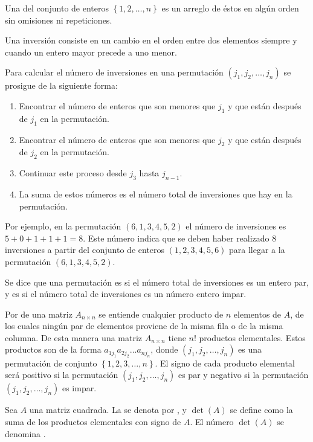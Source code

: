 \documentclass[a4paper,12pt]{article}
\begin{document}
\begin{concept}
  Una  del conjunto de enteros $\left\{ 1,2,\ldots,n \right\}$
  es un arreglo de éstos en algún orden sin omisiones ni repeticiones.
\end{concept}

Una inversión consiste en un cambio en el orden entre dos elementos siempre y
cuando un entero mayor precede a uno menor.

Para calcular el número de inversiones en una permutación
$(j_1,j_2,\ldots,j_n)$ se prosigue de la siguiente forma:
\begin{enumerate}
  \item Encontrar el número de enteros que son menores que $j_1$ y que están
    después de $j_1$ en la permutación.
  \item Encontrar el número de enteros que son menores que $j_2$ y que están
    después de $j_2$ en la permutación.
  \item Continuar este proceso desde $j_3$ hasta $j_{n-1}$.
  \item La suma de estos números es el número total de inversiones que hay en
    la permutación.
\end{enumerate}
Por ejemplo, en la permutación $(6,1,3,4,5,2)$ el número de inversiones es
$5+0+1+1+1=8$. Este número indica que se deben haber realizado 8 inversiones a
partir del conjunto de enteros $(1,2,3,4,5,6)$ para llegar a la permutación
$(6,1,3,4,5,2)$.

Se dice que una permutación es  si el número total de inversiones es
un entero par, y es  si el número total de inversiones es un número
entero impar.

Por  de una matriz $A_{n\times n}$ se entiende cualquier producto
de $n$ elementos de $A$, de los cuales ningún par de elementos proviene de la
misma fila o de la misma columna. De esta manera una matriz $A_{n\times n}$
tiene $n!$ productos elementales. Estos productos son de la forma
$a_{1j_1}a_{2j_2}\ldots a_{nj_n}$, donde $(j_1,j_2,\ldots,j_n)$ es una
permutación de conjunto $\left\{ 1,2,3,\ldots,n \right\}$. El signo de cada producto
elemental será positivo si la permutación $(j_1,j_2,\ldots,j_n)$ es par y
negativo si la permutación $(j_1,j_2,\ldots,j_n)$ es impar.

\bigskip

\begin{concept}
  Sea $A$ una matriz cuadrada. La  se denota por
  , y $\det(A)$ se define como la suma de los productos elementales
  con signo de $A$. El número $\det(A)$ se denomina .
\end{concept}
\end{document}
